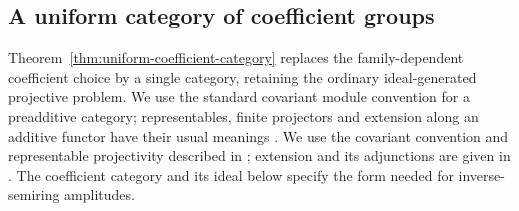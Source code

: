 \subsection{A uniform category of coefficient groups}
Theorem~\ref{thm:uniform-coefficient-category} replaces the
family-dependent coefficient choice by a single category,
retaining the ordinary ideal-generated projective problem.
We use the standard covariant module convention for a
preadditive category; representables, finite projectors and
extension along an additive functor have their usual meanings
\cite{Mitchell}. We use the covariant convention and representable
projectivity described in \cite[\S1, Proposition~3, pp.~1--4]{Murfet};
extension and its adjunctions are given in
\cite[\S4, Theorem~18 and Proposition~19, pp.~23--25]{Murfet}.
The coefficient category and its ideal below specify the form
needed for inverse-semiring amplitudes.

